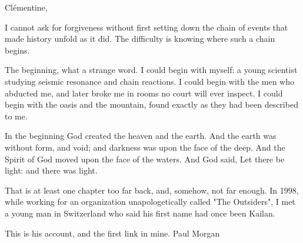\typeprologue

Clémentine,\par

I cannot ask for forgiveness without first setting down the chain of events that made history unfold as it did. The difficulty is knowing where such a chain begins. \par

The beginning, what a strange word. I could begin with myself: a young scientist studying seismic resonance and chain reactions. I could begin with the men who abducted me, and later broke me in rooms no court will ever inspect. I could begin with the oasis and the mountain, found exactly as they had been described to me.\par

In the beginning God created the heaven and the earth. And the earth was without form, and void; and darkness was upon the face of the deep. And the Spirit of God moved upon the face of the waters. And God said, Let there be light: and there was light.\par

That is at least one chapter too far back, and, somehow, not far enough. In 1998, while working for an organization unapologetically called "The Outsiders", I met a young man in Switzerland who said his first name had once been Kailan.\par

This is his account, and the first link in mine. Paul Morgan\par


\ornament